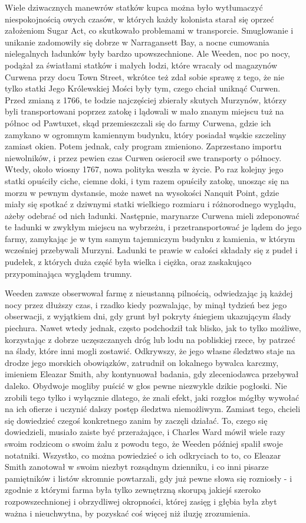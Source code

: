 Wiele dziwacznych manewrów statków kupca można było wytłumaczyć niespokojnością owych czasów, w których każdy kolonista starał się oprzeć założeniom Sugar Act, co skutkowało problemami w transporcie. Smuglowanie i unikanie zadomowiły się dobrze w Narragansett Bay, a nocne cumowania nielegalnych ładunków były bardzo upowszechnione. Ale Weeden, noc po nocy, podążał za światłami statków i małych łodzi, które wracały od magazynów Curwena przy docu Town Street, wkrótce też zdał sobie sprawę z tego, że nie tylko statki Jego Królewskiej Mości były tym, czego chciał uniknąć Curwen. Przed zmianą z 1766, te łodzie najczęściej zbierały skutych Murzynów, którzy byli transportowani poprzez zatokę i lądowali w mało znanym miejscu tuż na północ od Pawtuxet, skąd przemieszczali się do farmy Curwena, gdzie ich zamykano w ogromnym kamiennym budynku, który posiadał wąskie szczeliny zamiast okien. Potem jednak, cały program zmieniono. Zaprzestano importu niewolników, i przez pewien czas Curwen osierocił swe transporty o północy. Wtedy, około wiosny 1767, nowa polityka weszła w życie. Po raz kolejny jego statki opuściły ciche, ciemne doki, i tym razem opuściły zatokę, unosząc się na morzu w pewnym dystansie, może nawet na wysokości Nanquit Point, gdzie miały się spotkać z dziwnymi statki wielkiego rozmiaru i różnorodnego wyglądu, ażeby odebrać od nich ładunki. Następnie, marynarze Curwena mieli zdeponować te ładunki w zwykłym miejscu na wybrzeżu, i przetransportować je lądem do jego farmy, zamykając je w tym samym tajemniczym budynku z kamienia, w którym wcześniej przebywali Murzyni. Ładunki te prawie w całości składały się z pudeł i pudełek, z których duża część była wielka i ciężka, oraz zaskakująco przypominająca wyglądem trumny.

Weeden zawsze obserwował farmę z nieustanną pilnością, odwiedzając ją każdej nocy przez dłuższy czas, i rzadko kiedy pozwalając, by minął tydzień bez jego obserwacji, z wyjątkiem dni, gdy grunt był pokryty śniegiem ukazującym ślady piechura. Nawet wtedy jednak, często podchodził tak blisko, jak to tylko możliwe, korzystając z dobrze uczęszczanych dróg lub lodu na pobliskiej rzece, by patrzeć na ślady, które inni mogli zostawić. Odkrywszy, że jego własne śledztwo staje na drodze jego morskich obowiązków, zatrudnił on lokalnego bywalca karczmy, imieniem Eleazar Smith, aby kontynuował badania, gdy zleceniodawca przebywał daleko. Obydwoje mogliby puścić w głos pewne niezwykle dzikie pogłoski. Nie zrobili tego tylko i wyłącznie dlatego, że znali efekt, jaki rozgłos mógłby wywołać na ich ofierze i uczynić dalszy postęp śledztwa niemożliwym. Zamiast tego, chcieli się dowiedzieć czegoś konkretnego zanim by zaczęli działać. To, czego się dowiedzieli, musiało zaiste być przerażające, i Charles Ward mówił wiele razy swoim rodzicom o swoim żalu z powodu tego, że Weeden później spalił swoje notatniki. Wszystko, co można powiedzieć o ich odkryciach to to, co Eleazar Smith zanotował w swoim niezbyt rozsądnym dzienniku,  i co inni pisarze pamiętników i listów skromnie powtarzali, gdy już pewne słowa się rozniosły - i zgodnie z którymi farma była tylko zewnętrzną skorupą jakiejś szeroko rozpowszechnionej i obrzydliwej okropności, której zasięg i głębia była zbyt ważna i nieuchwytna, by pozyskać coś więcej niż iluzję zrozumienia. 

